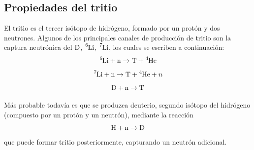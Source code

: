 \subsection{Propiedades del tritio}

El tritio  es el tercer isótopo de hidrógeno, formado por un protón y dos neutrones. Algunos de los principales canales de producción de tritio son la captura neutrónica del $\ce{D}$, $\ce{^6Li}$, $\ce{^7Li}$,  los cuales se escriben a continuación:
\begin{equation}
\ce{^{6}Li} +  \ce{n} \rightarrow \ce{T} + \ce{^{4}He}
\label{capneuLi6}
\end{equation}
\begin{equation}
\ce{^{7}Li} + \ce{n} \rightarrow  \ce{T} + \ce{^{4}He} + n
\label{capneuLi7}
\end{equation}
\begin{equation}
\ce{D} +  \ce{n} \rightarrow  \ce{T}  
\label{capneuH}
\end{equation}

Más probable todavía es que se produzca deuterio, segundo isótopo del hidrógeno (compuesto por un protón y un neutrón),  mediante la reacción
\begin{equation}
\ce{H} +  \ce{n} \rightarrow  \ce{D}  
\label{capneuD}
\end{equation}
que puede formar tritio  posteriormente, capturando un neutrón adicional. 

